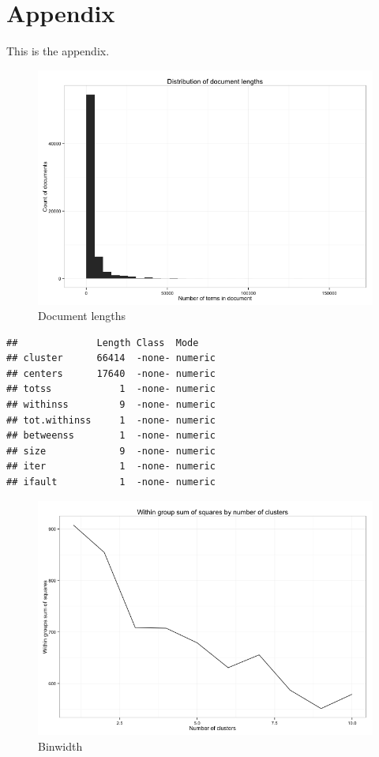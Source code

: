 \documentclass[11pt,article,oneside]{memoir}
\makeatletter
\def\maxwidth{\ifdim\Gin@nat@width>\linewidth\linewidth
\else\Gin@nat@width\fi}
\let\Oldincludegraphics\includegraphics
\renewcommand{\includegraphics}[1]{\Oldincludegraphics[width=\maxwidth]{#1}}
\makeatother
\begin{document}
\section{Appendix}\label{appendix}

This is the appendix.

\begin{figure}[htbp]
\centering
\includegraphics{figure/Document-Lengths.png}
\caption{Document lengths}
\end{figure}

\begin{verbatim}
##              Length Class  Mode   
## cluster      66414  -none- numeric
## centers      17640  -none- numeric
## totss            1  -none- numeric
## withinss         9  -none- numeric
## tot.withinss     1  -none- numeric
## betweenss        1  -none- numeric
## size             9  -none- numeric
## iter             1  -none- numeric
## ifault           1  -none- numeric
\end{verbatim}

\begin{figure}[htbp]
\centering
\includegraphics{figure/Cluster-Diagnostics.png}
\caption{Binwidth}
\end{figure}
\end{document}
